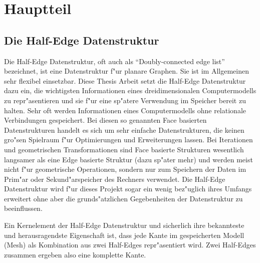 \documentclass[pagesize, paper=a4, fontsize=12pt,titlepage=true, headings=small, headnosepline, abstractoff, liststotoc, nochapterprefix, plainheadsepline]{scrreprt}
\newcommand{\CSS}{C\texttt{\# }}
\newcommand{\HES}{Half-Edge Datenstruktur }
\begin{document}
\chapter {Hauptteil}

	\section {Die \HES}
		Die Half-Edge Datenstruktur, oft auch als "`Doubly-connected edge list"' bezeichnet, ist eine Datenstruktur f"ur planare Graphen. Sie ist im Allgemeinen sehr flexibel einsetzbar. Diese Thesis Arbeit setzt die \HES dazu ein, die wichtigsten Informationen eines dreidimensionalen Computermodells zu repr"asentieren und sie f"ur eine sp"atere Verwendung im Speicher bereit zu halten. Sehr oft werden Informationen eines Computermodells ohne relationale Verbindungen gespeichert. Bei diesen so genannten Face basierten Datenstrukturen handelt es sich um sehr einfache Datenstrukturen, die keinen gro"sen Spielraum f"ur Optimierungen und Erweiterungen lassen. Bei Iterationen und geometrischen Transformationen sind Face basierte Strukturen wesentlich langsamer als eine Edge basierte Struktur (dazu sp"ater mehr) und werden meist nicht f"ur geometrische Operationen, sondern nur zum Speichern der Daten im Prim"ar oder Sekund"arspeicher des Rechners verwendet. Die \HES wird f"ur dieses Projekt sogar ein wenig bez"uglich ihres Umfangs erweitert ohne aber die grunds"atzlichen Gegebenheiten der Datenstruktur zu beeinflussen.
\newline

Ein Kernelement der \HES und sicherlich ihre bekannteste und herausragendste Eigenschaft ist, dass jede Kante im gespeicherten Modell (Mesh) als Kombination aus zwei Half-Edges repr"asentiert wird. Zwei Half-Edges zusammen ergeben also eine komplette Kante.
\newline
\end{document}

